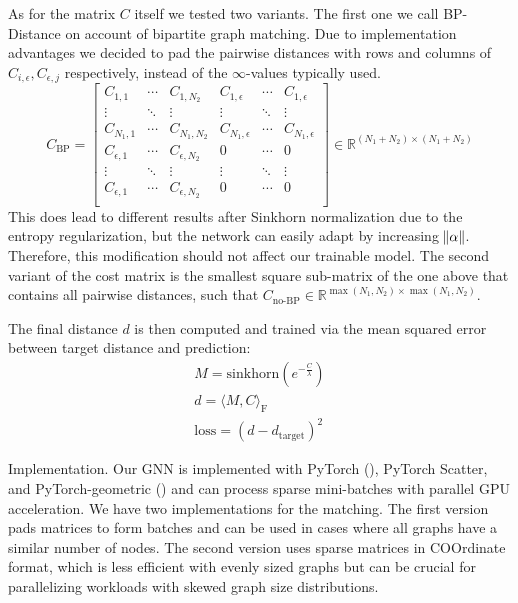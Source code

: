 As for the matrix $C$ itself we tested two variants. The first one we call BP-Distance on account of bipartite graph matching. Due to implementation advantages we decided to pad the pairwise distances with rows and columns of $C_{i, \epsilon}, C_{\epsilon, j}$ respectively, instead of the $\infty$-values typically used.
\begin{equation}
     C_\text{BP}=
          \left[
          \begin{array}{ccc|ccc}
               C_{1,1} & \dotsi & C_{1, N_2} & C_{1, \epsilon} & \dotsi & C_{1, \epsilon} \\
               \vdots & \ddots & \vdots & \vdots & \ddots & \vdots \\
               C_{N_1, 1} & \dotsi & C_{N_1, N_2} & C_{N_1, \epsilon} & \dotsi & C_{N_1, \epsilon} \\
               \hline
               C_{\epsilon, 1} & \dotsi & C_{\epsilon, N_2} & 0 & \dotsi & 0 \\
               \vdots & \ddots & \vdots & \vdots & \ddots & \vdots \\
               C_{\epsilon, 1} & \dotsi & C_{\epsilon, N_2} & 0 & \dotsi & 0 \\
          \end{array}
          \right]
     \in \mathbb{R}^{(N_1 + N_2) \times (N_1 + N_2)}
\end{equation}
This does lead to different results after Sinkhorn normalization due to the entropy regularization, but the network can easily adapt by increasing $\norm{\alpha}$. Therefore, this modification should not affect our trainable model. The second variant of the cost matrix is the smallest square sub-matrix of the one above that contains all pairwise distances, such that \mbox{$C_\text{no-BP} \in \mathbb{R}^{\max({N_1, N_2}) \times \max({N_1, N_2})}$}.

The final distance $d$ is then computed and trained via the mean squared error between target distance and prediction:
\begin{equation}
     \begin{gathered}
          M = \text{sinkhorn}(e^{-\frac{C}{\lambda}}) \\
          d = \langle M, C \rangle_\mathrm{F} \\
          \text{loss} = (d - d_\text{target})^2
     \end{gathered}
\end{equation}

Implementation. Our GNN is implemented with PyTorch (\citealp{pytorch}), PyTorch Scatter, and PyTorch-geometric (\citealp{pytorchgeometric}) and can process sparse mini-batches with parallel GPU acceleration. We have two implementations for the matching. The first version pads matrices to form batches and can be used in cases where all graphs have a similar number of nodes. The second version uses sparse matrices in COOrdinate format, which is less efficient with evenly sized graphs but can be crucial for parallelizing workloads with skewed graph size distributions.


